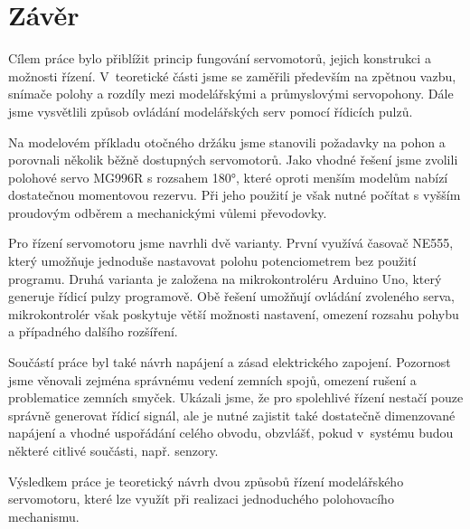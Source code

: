 \chapter{Závěr}

Cílem práce bylo přiblížit princip fungování servomotorů, jejich konstrukci a možnosti řízení. V~teoretické části jsme se zaměřili především na zpětnou vazbu, snímače polohy a rozdíly mezi modelářskými a průmyslovými servopohony. Dále jsme vysvětlili způsob ovládání modelářských serv pomocí řídicích pulzů.

Na modelovém příkladu otočného držáku jsme stanovili požadavky na pohon a porovnali několik běžně dostupných servomotorů. Jako vhodné řešení jsme zvolili polohové servo MG996R s rozsahem 180°, které oproti menším modelům nabízí dostatečnou momentovou rezervu. Při jeho použití je však nutné počítat s vyšším proudovým odběrem a mechanickými vůlemi převodovky.

Pro řízení servomotoru jsme navrhli dvě varianty. První využívá časovač NE555, který umožňuje jednoduše nastavovat polohu potenciometrem bez použití programu. Druhá varianta je založena na mikrokontroléru Arduino Uno, který generuje řídicí pulzy programově. Obě řešení umožňují ovládání zvoleného serva, mikrokontrolér však poskytuje větší možnosti nastavení, omezení rozsahu pohybu a případného dalšího rozšíření.

Součástí práce byl také návrh napájení a zásad elektrického zapojení. Pozornost jsme věnovali zejména správnému vedení zemních spojů, omezení rušení a problematice zemních smyček. Ukázali jsme, že pro spolehlivé řízení nestačí pouze správně generovat řídicí signál, ale je nutné zajistit také dostatečně dimenzované napájení a vhodné uspořádání celého obvodu, obzvlášť, pokud v~systému budou některé citlivé součásti, např. senzory. 

Výsledkem práce je teoretický návrh dvou způsobů řízení modelářského servomotoru, které lze využít při realizaci jednoduchého polohovacího mechanismu.
